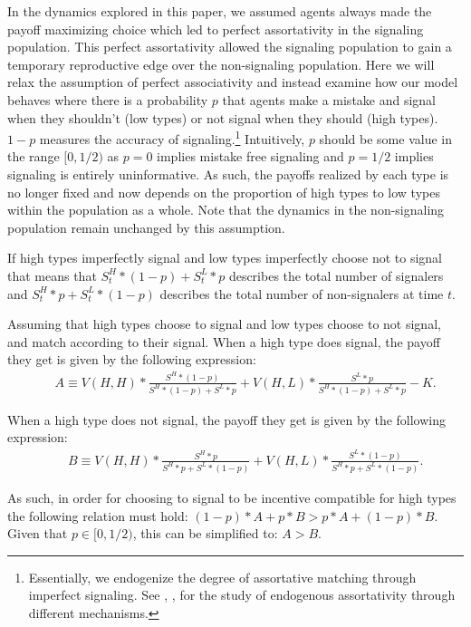 In the dynamics explored in this paper, we assumed agents always made the payoff maximizing choice which led to perfect assortativity in the signaling population. This perfect assortativity allowed the signaling population to gain a temporary reproductive edge over the non-signaling population. Here we will relax the assumption of perfect associativity and instead examine how our model behaves where there is a probability $p$ that agents make a mistake and signal when they shouldn't (low types) or not signal when they should (high types). $1-p$ measures the accuracy of signaling.\footnote{Essentially, we endogenize the degree of assortative matching through imperfect signaling. See \cite{NaxRigos2016}, \cite{Newton2017IJGT}, \citet{wu2016,wu2018,wu2023wp} for the study of endogenous assortativity through different mechanisms.} Intuitively, $p$ should be some value in the range $[0,1/2)$ as $p=0$ implies mistake free signaling and $p=1/2$ implies signaling is entirely uninformative. As such, the payoffs realized by each type is no longer fixed and now depends on the proportion of high types to low types within the population as a whole. Note that the dynamics in the non-signaling population remain unchanged by this assumption. 

If high types imperfectly signal and low types imperfectly choose not to signal that means that $S^H_t*(1-p) + S^L_t*p$ describes the total number of signalers and $S^H_t*p + S^L_t*(1-p)$ describes the total number of non-signalers at time $t$.

Assuming that high types choose to signal and low types choose to not signal, and match according to their signal. When a high type does signal, the payoff they get is given by the following expression:
\setlength{\belowdisplayskip}{4pt} \setlength{\belowdisplayshortskip}{4pt}
\setlength{\abovedisplayskip}{4pt} \setlength{\abovedisplayshortskip}{4pt}
\begin{eqnarray}
&& A \equiv V(H,H) * \frac{S^H*(1-p)}{S^H*(1-p)+S^L*p} + V(H,L) * \frac{S^L*p}{S^H*(1-p)+S^L*p} - K. \label{imperfectsignaldynamic1}
\end{eqnarray}

When a high type does not signal, the payoff they get is given by the following expression:
\begin{eqnarray}
&& B \equiv V(H,H) * \frac{S^H*p}{S^H*p+S^L*(1-p)} + V(H,L) * \frac{S^L*(1-p)}{S^H*p+S^L*(1-p)}. \label{imperfectsignaldynamic2}
\end{eqnarray}

As such, in order for choosing to signal to be incentive compatible for high types the following relation must hold:
$(1-p)*A + p*B > p*A + (1-p)*B.$ Given that $p \in [0,1/2)$, this can be simplified to: $A > B$.

